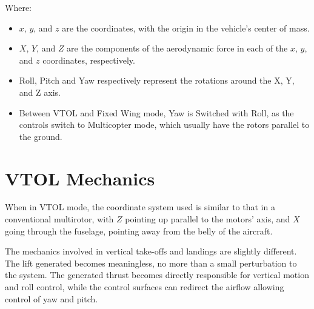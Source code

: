 Where:


\begin{itemize}

\item $x$, $y$, and $z$ are the coordinates, with the origin in the vehicle's center of mass.
\item $X$, $Y$, and $Z$ are the components of the aerodynamic force in each of the $x$, $y$, and $z$ coordinates, respectively.
\item Roll, Pitch and Yaw respectively represent the rotations around the X, Y, and Z axis.
\item Between VTOL and Fixed Wing mode, Yaw is Switched with Roll, as the controls switch to Multicopter mode, which usually have the rotors parallel to the ground.


\end{itemize}

\section{VTOL Mechanics}

When in VTOL mode, the coordinate system used is similar to that in a conventional multirotor, with $Z$ pointing up parallel to the motors' axis, and $X$ going through the fuselage, pointing away from the belly of the aircraft.

The mechanics involved in vertical take-offs and landings are slightly different. The lift generated becomes meaningless, no more than a small perturbation to the system. The generated thrust becomes directly responsible for vertical motion and roll control, while the control surfaces can redirect the airflow allowing control of yaw and pitch.

